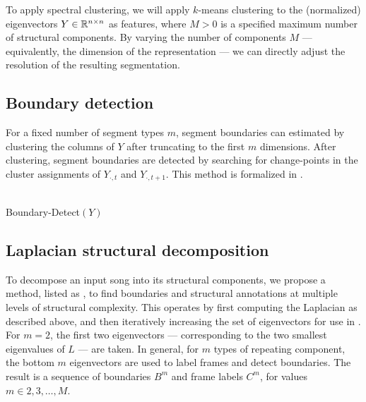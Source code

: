\documentclass{article}
\begin{document}
To apply spectral clustering, we will apply $k$-means clustering to the (normalized) 
eigenvectors $Y \in \mathbb{R}^{n \times n}$ as features, where $M > 0$ is a 
specified maximum number of structural components.  By varying the number of
components $M$ --- equivalently, the dimension of the representation --- we can
directly adjust the resolution of the resulting segmentation.


\subsection{Boundary detection}
For a fixed number of segment types $m$, segment boundaries can estimated 
by clustering the columns of $Y$ after truncating to the first $m$ dimensions.
After clustering, segment boundaries are detected by searching for change-points in
the cluster assignments of $Y_{\cdot,t}$ and $Y_{\cdot,t+1}$.  This method is
formalized in .

\begin{algorithm}[t]
\caption{Boundary detection\label{bd}}
\begin{algorithmic}[1]
\\

{\sc Boundary-Detect}$(Y)$
\end{algorithmic}
\end{algorithm}


\subsection{Laplacian structural decomposition}

To decompose an input song into its structural components, we propose a method, listed
as ,
to find boundaries and structural annotations at multiple levels of structural
complexity.  This operates by first computing the Laplacian as described above, and
then iteratively increasing the set of eigenvectors for use in .  For $m=2$,
the first two eigenvectors --- corresponding to the two smallest eigenvalues of $L$
--- are taken.  In general, for $m$ types of repeating component, the bottom $m$
eigenvectors are used to label frames and detect boundaries.  The result is a sequence
of boundaries $B^m$ and frame labels $C^m$, for values $m \in 2, 3, \dots, M$.
\end{document}
